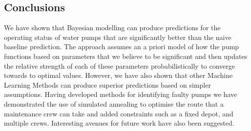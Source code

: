 \documentclass{article} %
\begin{document}
\begin{multicols}{2}
\section*{Conclusions}

We have shown that Bayesian modelling can produce predictions for the operating status of water pumps that are significantly better than the naive baseline prediction. The approach assumes an a priori model of how the pump functions based on parameters that we believe to be significant and then updates the relative strength of each of these parameters probabilistically to converge towards to optimal values. However, we have also shown that other Machine Learning Methods can produce superior predictions based on simpler assumptions. Having developed methods for identifying faulty pumps we have demonstrated the use of simulated annealing to optimise the route that a maintenance crew can take and added constraints such as a fixed depot, and multiple crews. Interesting avenues for future work have also been suggested. 



\end{multicols}
\end{document}
